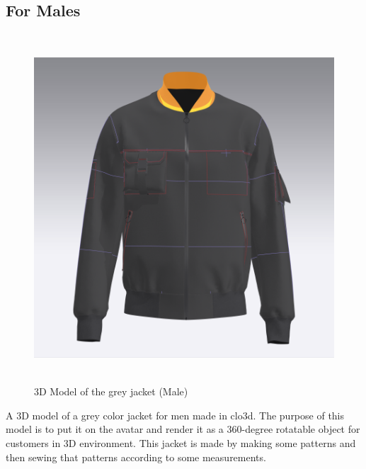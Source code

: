 \subsection{For Males}
\begin{figure}[H]
    \centering
    \includegraphics[width=13cm,height=13cm]{Figures/3DJackets/male1.png}
    \caption{3D Model of the grey jacket (Male)}
    \label{fig1:3D Model of the grey jacket (Male)}
   
\end{figure}
\justifying
 A 3D model of a grey color jacket for men made in clo3d. The purpose of this model is to put it on the avatar and render it as a 360-degree rotatable object for customers in 3D environment. This jacket is made by making some patterns and then sewing that patterns according to some measurements.
